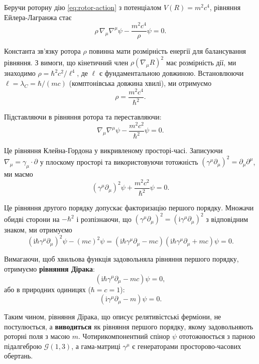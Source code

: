 \documentclass[11pt,a4paper]{article}
\numberwithin{equation}{section}
\theoremstyle{plain}
\theoremstyle{definition}
\theoremstyle{remark}
\newcommand{\ii}{\mathrm{i}}
\begin{document}
Беручи роторну дію \eqref{eq:rotor-action} з потенціалом $V(R) = m^2c^4$, рівняння Ейлера-Лагранжа стає
\begin{equation}
\rho\, \nabla_\mu \nabla^\mu \psi - \frac{m^2c^4}{\rho}\psi = 0.
\end{equation}

Константа зв'язку ротора $\rho$ повинна мати розмірність енергії для балансування рівняння. З вимоги, що кінетичний член $\rho (\nabla_\mu R)^2$ має розмірність дії, ми знаходимо $\rho = \hbar^2 c^2/\ell^4$, де $\ell$ є фундаментальною довжиною. Встановлюючи $\ell = \lambda_C = \hbar/(mc)$ (комптонівська довжина хвилі), ми отримуємо
\begin{equation}
\rho = \frac{m^2c^4}{\hbar^2}.
\end{equation}

Підставляючи в рівняння ротора та переставляючи:
\begin{equation}
\nabla_\mu \nabla^\mu \psi - \frac{m^2c^2}{\hbar^2}\psi = 0.
\end{equation}

Це рівняння Клейна-Гордона у викривленому просторі-часі. Записуючи $\nabla_\mu = \gamma_\mu \cdot \partial$ у плоскому просторі та використовуючи тотожність $(\gamma^\mu \partial_\mu)^2 = \partial_\mu \partial^\mu$, ми маємо
\begin{equation}
(\gamma^\mu \partial_\mu)^2 \psi + \frac{m^2c^2}{\hbar^2}\psi = 0.
\end{equation}

Це рівняння другого порядку допускає факторизацію першого порядку. Множачи обидві сторони на $-\hbar^2$ і розпізнаючи, що $(\gamma^\mu \partial_\mu)^2 = (\ii\gamma^\mu \partial_\mu)^2$ з відповідним знаком, ми отримуємо
\begin{equation}
(\ii\hbar\gamma^\mu \partial_\mu)^2\psi - (mc)^2\psi = (\ii\hbar\gamma^\mu \partial_\mu - mc)(\ii\hbar\gamma^\mu \partial_\mu + mc)\psi = 0.
\end{equation}

Вимагаючи, щоб хвильова функція задовольняла рівняння першого порядку, отримуємо \textbf{рівняння Дірака}:
\begin{equation}
(\ii\hbar\gamma^\mu \partial_\mu - mc)\psi = 0,
\label{eq:dirac}
\end{equation}
або в природних одиницях ($\hbar = c = 1$):
\begin{equation}
(\ii\gamma^\mu \partial_\mu - m)\psi = 0.
\end{equation}

Таким чином, рівняння Дірака, що описує релятивістські ферміони, не постулюється, а \textbf{виводиться} як рівняння першого порядку, якому задовольняють роторні поля з масою $m$. Чотирикомпонентний спінор $\psi$ ототожнюється з парною підалгеброю $\mathcal{G}(1,3)$, а гама-матриці $\gamma^\mu$ є генераторами просторово-часових обертань.
\end{document}
